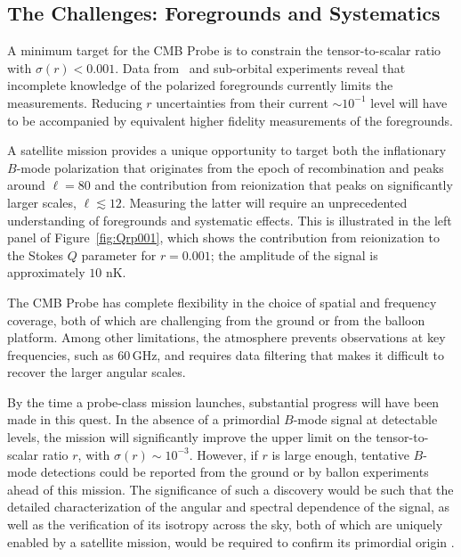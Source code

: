 \subsection{The Challenges: Foregrounds and Systematics}
\label{sec:foregrounds}
\vspace{-0.05in}

A minimum target for the CMB Probe is to constrain the tensor-to-scalar ratio with $\sigma(r) < 0.001$. Data from \planck\ and 
sub-orbital experiments reveal that incomplete knowledge of the polarized foregrounds currently limits the measurements. 
Reducing $r$ uncertainties from their current $\sim\!10^{-1}$ level will have to be accompanied by equivalent higher fidelity measurements of the foregrounds.

A satellite mission provides a unique opportunity to target both the inflationary $B$-mode polarization that originates from the epoch of recombination and peaks around $\ell=80$ and the contribution from reionization that peaks on significantly larger scales, $\ell\lesssim 12$. Measuring the latter will require an unprecedented understanding of foregrounds and systematic effects. This is illustrated in the left panel of Figure~\ref{fig:Qrp001}, which shows the contribution from reionization to the Stokes $Q$ parameter for $r=0.001$; the amplitude of the signal is approximately $10$ nK.


The CMB Probe has complete flexibility in the choice of spatial and frequency coverage, both of which are challenging from the ground or from the balloon platform.  Among other limitations, the atmosphere prevents observations at key frequencies, such as 60\,GHz, and requires data filtering that makes it difficult to recover the larger angular scales.

By the time a probe-class mission launches, substantial progress will
have been made in this quest.  In the absence of a primordial $B$-mode
signal at detectable levels, the mission will significantly improve
the upper limit on the tensor-to-scalar ratio $r$, with
$\sigma(r)\!\sim\!10^{-3}$.  However, if $r$ is large enough,
tentative $B$-mode detections could be reported from the ground or by
ballon experiments ahead of this mission. The significance of such a
discovery would be such that the detailed characterization of the
angular and spectral dependence of the signal, as well as the
verification of its isotropy across the sky, both of which are
uniquely enabled by a satellite mission, would be required to confirm
its primordial origin .

